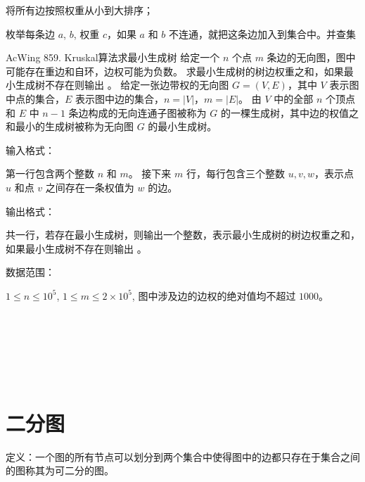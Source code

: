\begin{myenum}
    \item 将所有边按照权重从小到大排序；
    \item 枚举每条边 $a$, $b$, 权重 $c$，如果 $a$ 和 $b$ 不连通，就把这条边加入到集合中。并查集
\end{myenum}

\begin{titledbox}{AcWing 859. Kruskal算法求最小生成树}
    给定一个 $n$ 个点 $m$ 条边的无向图，图中可能存在重边和自环，边权可能为负数。 求最小生成树的树边权重之和，如果最小生成树不存在则输出 。 给定一张边带权的无向图 $G=(V, E)$，其中 $V$ 表示图中点的集合，$E$ 表示图中边的集合，$n=|V|$，$m=|E|$。 由 $V$ 中的全部 $n$ 个顶点和 $E$ 中 $n-1$ 条边构成的无向连通子图被称为 $G$ 的一棵生成树，其中边的权值之和最小的生成树被称为无向图 $G$ 的最小生成树。

    输入格式：

    第一行包含两个整数 $n$ 和 $m$。 接下来 $m$ 行，每行包含三个整数 $u,v,w$，表示点 $u$ 和点 $v$ 之间存在一条权值为 $w$ 的边。

    输出格式：

    共一行，若存在最小生成树，则输出一个整数，表示最小生成树的树边权重之和，如果最小生成树不存在则输出 。

    数据范围：

    $1 \le n \le 10^5$, $1 \le m \le 2 \times 10^5$, 图中涉及边的边权的绝对值均不超过 $1000$。

    \begin{inputblock}
         \\
         \\
         \\
         \\
         \\
    \end{inputblock}
    \begin{outputblock}
    \end{outputblock}
\end{titledbox}


\section{二分图}

定义：一个图的所有节点可以划分到两个集合中使得图中的边都只存在于集合之间的图称其为可二分的图。


